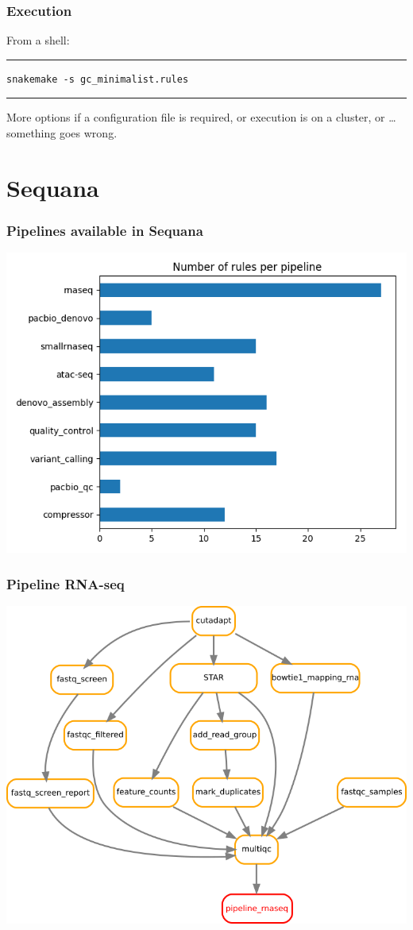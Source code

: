 \documentclass{beamer}
\begin{document}
\begin{frame}[fragile]
  \frametitle{Execution}
  From a shell:
  \rule{\textwidth}{1pt}
  \begin{lstlisting}[basicstyle=\ttfamily\large]
snakemake -s gc_minimalist.rules
  \end{lstlisting}
  \rule{\textwidth}{1pt}
  More options if a configuration file is required, or execution is on a cluster, 
  or \dots something goes wrong.
\end{frame}


\section{Sequana}

\begin{frame}
  \frametitle{Pipelines available in Sequana}
  \includegraphics[scale=.6]{images/number_pipeline.png}
\end{frame}

\begin{frame}
\frametitle{Pipeline RNA-seq}
  \centering
  \includegraphics[scale=0.45]{./images/rnaseq.png}
\end{frame}
\end{document}
